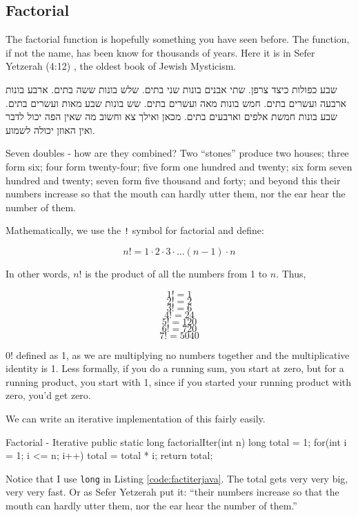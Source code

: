 \subsection{Factorial}
The factorial function is hopefully something you have seen before.  The function, if not the name, has been know for thousands of years.  Here it is in Sefer Yetzerah (4:12)\cite{sefery} \cite{mordell1914origin}, the oldest book of Jewish Mysticism.
\begin{displayquote}
\foreignlanguage{hebrew}{שבע כפולות כיצד צרפן. שתי אבנים בונות שני בתים. שלש בונות ששה בתים. ארבע בונות ארבעה ועשרים בתים. חמש בונות מאה ועשרים בתים. שש בונות שבע מאות ועשרים בתים. שבע בונות חמשת אלפים וארבעים בתים. מכאן ואילך צא וחשוב מה שאין הפה יכול לדבר ואין האוזן יכולה לשמוע.}

Seven doubles - how are they combined? Two ``stones'' produce two houses; three form six; four form twenty-four; five form one hundred and twenty; six form seven hundred and twenty; seven form five thousand and forty; and beyond this their numbers increase so that the mouth can hardly utter them, nor the ear hear the number of them.
\end{displayquote}
Mathematically, we use the \texttt{!} symbol for factorial and define:

$$n! = 1\cdot2\cdot3\cdot\dots (n-1)\cdot n$$  


In other words, $n!$ is the product of all the numbers from 1 to $n$.  Thus,

$$1! = 1$$
$$2! = 2$$
$$3! = 6$$
$$4! = 24$$
$$5! = 120$$
$$6! = 720$$
$$7! = 5040$$


$0!$ defined as 1, as we are multiplying no numbers together  and the multiplicative identity is 1. Less formally, if you do a running sum, you start at zero, but for a running product, you start with 1, since if you started your running product with zero, you'd get zero.

We can write an iterative implementation of this fairly easily.

\begin{javacode}[label={code:factiterjava}]{Factorial - Iterative}
public static long factorialIter(int n) {
	long total = 1;
	for(int i = 1; i <= n; i++) {
		total =  total * i;
	}
	return total;
}
\end{javacode}


Notice that I use \texttt{long} in Listing \ref{code:factiterjava}.  The total gets very very big, very very fast.  Or as Sefer Yetzerah put it: ``their numbers increase so that the mouth can hardly utter them, nor the ear hear the number of them.''

